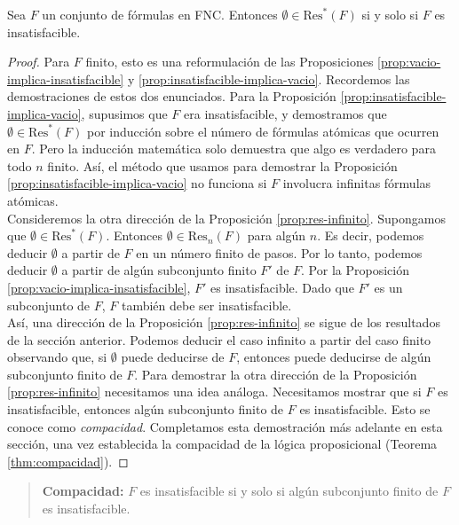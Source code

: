 \documentclass[12pt,a4paper]{book}
\begin{document}
    \begin{proposicion}\label{prop:res-infinito}
        Sea $F$ un conjunto de fórmulas en FNC. Entonces $\emptyset\in\mathrm{Res}^{*}(F)$ si y solo si $F$ es
        insatisfacible.
    \end{proposicion}
    \begin{proof}
        Para $F$ finito, esto es una reformulación de las Proposiciones \ref{prop:vacio-implica-insatisfacible} y
        \ref{prop:insatisfacible-implica-vacio}. Recordemos las demostraciones de estos dos enunciados. Para la Proposición
        \ref{prop:insatisfacible-implica-vacio}, supusimos que $F$ era insatisfacible, y demostramos que
        $\emptyset\in\mathrm{Res}^{*}(F)$ por inducción sobre el número de fórmulas atómicas que ocurren en $F$. Pero la
        inducción matemática solo demuestra que algo es verdadero para todo $n$ finito. Así, el método que usamos para
        demostrar la Proposición \ref{prop:insatisfacible-implica-vacio} no funciona si $F$ involucra infinitas fórmulas
        atómicas.\\
        Consideremos la otra dirección de la Proposición \ref{prop:res-infinito}. Supongamos que
        $\emptyset\in\mathrm{Res}^{*}(F)$. Entonces $\emptyset\in\mathrm{Res}_{n}(F)$ para algún $n$. Es decir, podemos
        deducir $\emptyset$ a partir de $F$ en un número finito de pasos. Por lo tanto, podemos deducir $\emptyset$ a partir
        de algún subconjunto finito $F'$ de $F$. Por la Proposición \ref{prop:vacio-implica-insatisfacible}, $F'$ es
        insatisfacible. Dado que $F'$ es un subconjunto de $F$, $F$ también debe ser insatisfacible.\\
        Así, una dirección de la Proposición \ref{prop:res-infinito} se sigue de los resultados de la sección anterior.
        Podemos deducir el caso infinito a partir del caso finito observando que, si $\emptyset$ puede deducirse de $F$,
        entonces puede deducirse de algún subconjunto finito de $F$. Para demostrar la otra dirección de la Proposición
        \ref{prop:res-infinito} necesitamos una idea análoga. Necesitamos mostrar que si $F$ es insatisfacible, entonces
        algún subconjunto finito de $F$ es insatisfacible. Esto se conoce como \textit{compacidad}. Completamos esta
        demostración más adelante en esta sección, una vez establecida la compacidad de la lógica proposicional (Teorema
        \ref{thm:compacidad}).
    \end{proof}

    \begin{quote}
        \textbf{Compacidad:} $F$ es insatisfacible si y solo si algún subconjunto finito de $F$ es insatisfacible.
    \end{quote}
\end{document}
